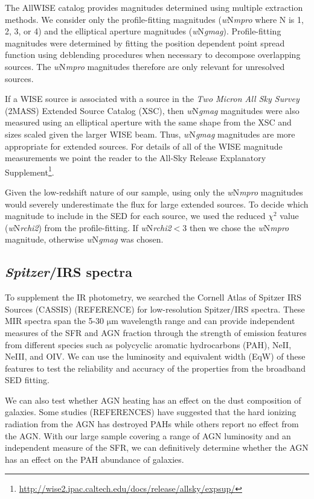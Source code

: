 \documentclass[fleqn,usenatbib]{mnras}
\newcommand{\um}{$\mathrm{\mu}$m}
\begin{document}
The AllWISE catalog provides magnitudes determined using multiple extraction methods. We consider only the profile-fitting magnitudes (\textit{w}N\textit{mpro} where N is 1, 2, 3, or 4) and the elliptical aperture magnitudes (\textit{w}N\textit{gmag}). Profile-fitting magnitudes were determined by fitting the position dependent point spread function using deblending procedures when necessary to decompose overlapping sources. The \textit{w}N\textit{mpro} magnitudes therefore are only relevant for unresolved sources.

If a WISE source is associated with a source in the \textit{Two Micron All Sky Survey} (2MASS) Extended Source Catalog (XSC), then \textit{w}N\textit{gmag} magnitudes were also measured using an elliptical aperture with the same shape from the XSC and sizes scaled given the larger WISE beam. Thus, \textit{w}N\textit{gmag} magnitudes are more appropriate for extended sources. For details of all of the WISE magnitude measurements we point the reader to the All-Sky Release Explanatory Supplement\footnote{\url{http://wise2.ipac.caltech.edu/docs/release/allsky/expsup/}}.

Given the low-redshift nature of our sample, using only the \textit{w}N\textit{mpro} magnitudes would severely underestimate the flux for large extended sources. To decide which magnitude to include in the SED for each source, we used the reduced $\chi^{2}$ value (\textit{w}N\textit{rchi2}) from the profile-fitting. If \textit{w}N\textit{rchi2}$<3$ then we chose the \textit{w}N\textit{mpro} magnitude, otherwise \textit{w}N\textit{gmag} was chosen. 

\subsection{\emph{Spitzer}/IRS spectra}
To supplement the IR photometry, we searched the Cornell Atlas of Spitzer IRS Sources (CASSIS) (REFERENCE) for low-resolution Spitzer/IRS spectra. These MIR spectra span the 5-30 \um{} wavelength range and can provide independent measures of the SFR and AGN fraction through the strength of emission features from different species such as polycyclic aromatic hydrocarbons (PAH), NeII, NeIII, and OIV. We can use the luminosity and equivalent width (EqW) of these features to test the reliability and accuracy of the properties from the broadband SED fitting. 

We can also test whether AGN heating has an effect on the dust composition of galaxies. Some studies (REFERENCES) have suggested that the hard ionizing radiation from the AGN has destroyed PAHs while others report no effect from the AGN. With our large sample covering a range of AGN luminosity and an independent measure of the SFR, we can definitively determine whether the AGN has an effect on the PAH abundance of galaxies.
\end{document}
